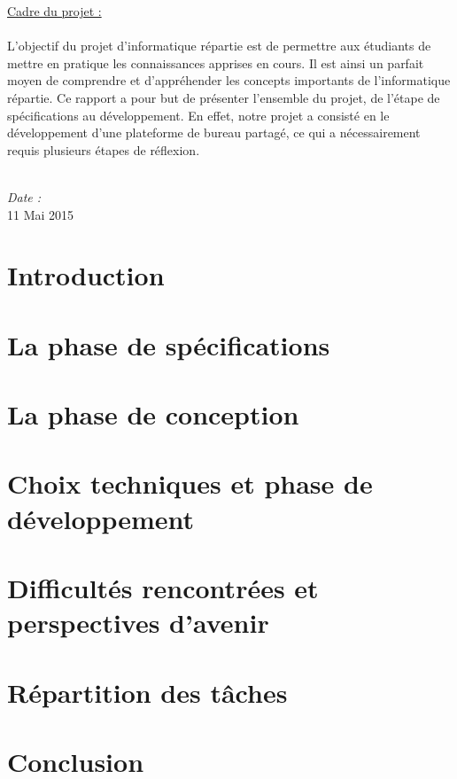 \documentclass[a4paper,12pt]{report}
\begin{document}
\begin{titlepage}
    \large{\underline{Cadre du projet : }} \\ \\
    \normalsize{L'objectif du projet d'informatique répartie est de permettre aux étudiants de 
        mettre en pratique les connaissances apprises en cours. Il est ainsi un parfait moyen
        de comprendre et d'appréhender les concepts importants de l'informatique répartie. Ce rapport
        a pour but de présenter l'ensemble du projet, de l'étape de spécifications au développement. En effet, 
        notre projet a consisté en le développement d'une plateforme de bureau partagé, ce qui a 
        nécessairement requis plusieurs étapes de réflexion.} \\ \\
    \begin{center}
        \textit{Date :} \\ 11 Mai 2015
    \end{center}
\end{titlepage}

\tableofcontents

\chapter*{Introduction}


\chapter{La phase de spécifications}


\chapter{La phase de conception}


\chapter{Choix techniques et phase de développement}


\chapter{Difficultés rencontrées et perspectives d'avenir}


\chapter{Répartition des tâches}


\chapter*{Conclusion}

\end{document}
